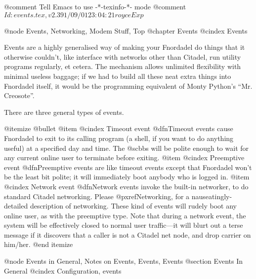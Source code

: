 @comment Tell Emacs to use -*-texinfo-*- mode
@comment $Id: events.tex,v 2.3 91/09/01 23:04:21 royce Exp $

@node Events, Networking, Modem Stuff, Top
@chapter Events
@cindex Events

Events are a highly generalised way of making your Fnordadel do
things that it otherwise couldn't, like interface with networks other than
Citadel, run utility programs regularly, et cetera.  The mechanism allows
unlimited flexibility with minimal useless baggage; if we had to build all
these neat extra things into Fnordadel itself, it would be the
programming equivalent of Monty Python's ``Mr. Creosote''.

There are three general types of events.

@itemize @bullet
@item
@cindex Timeout event
@dfn{Timeout events} cause Fnordadel to exit to
its calling program (a shell, if you want to do anything
useful) at a specified day and time.  The @sc{bbs} will be polite
enough to wait for any current online user to terminate
before exiting.
@item
@cindex Preemptive event
@dfn{Preemptive events} are like timeout events except that
Fnordadel won't be the least bit polite; it will
immediately boot anybody who is logged in.
@item
@cindex Network event
@dfn{Network events} invoke the built-in networker, to do
standard Citadel networking.  Please @pxref{Networking}, for a
nauseatingly-detailed description of networking.  These kind
of events will rudely boot any online user, as with the
preemptive type.  Note that during a network event, the system
will be effectively closed to normal user traffic---it will
blurt out a terse message if it discovers that a caller is not
a Citadel net node, and drop carrier on him/her.
@end itemize

@node Events in General, Notes on Events, Events, Events
@section Events In General
@cindex Configuration, events

